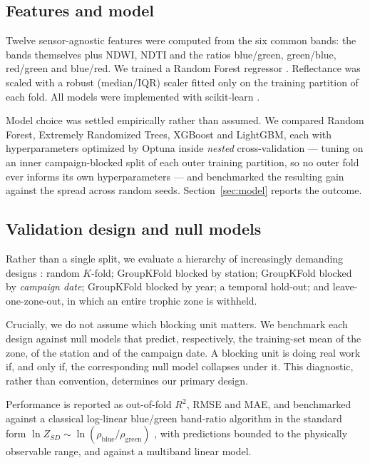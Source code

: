 \documentclass[final,5p,times,twocolumn,authoryear]{elsarticle}
\begin{document}
\subsection{Features and model}

Twelve sensor-agnostic features were computed from the six common bands: the
bands themselves plus NDWI, NDTI and the ratios blue/green, green/blue,
red/green and blue/red. We trained a Random Forest regressor
\citep{Breiman2001}. Reflectance was scaled with a robust (median/IQR) scaler
fitted only on the training partition of each fold. All models were
implemented with scikit-learn \citep{Pedregosa2011}.

Model choice was settled empirically rather than assumed. We compared Random
Forest, Extremely Randomized Trees, XGBoost \citep{Chen2016} and LightGBM,
each with hyperparameters optimized by Optuna \citep{Akiba2019} inside
\emph{nested} cross-validation --- tuning on an inner campaign-blocked split
of each outer training partition, so no outer fold ever informs its own
hyperparameters --- and benchmarked the resulting gain against the spread
across random seeds. Section~\ref{sec:model} reports the outcome.

\subsection{Validation design and null models}\label{sec:valdesign}

Rather than a single split, we evaluate a hierarchy of increasingly demanding
designs \citep{Roberts2017}: random $K$-fold; GroupKFold blocked by station;
GroupKFold blocked by \emph{campaign date}; GroupKFold blocked by year; a
temporal hold-out; and leave-one-zone-out, in which an entire trophic zone is
withheld.

Crucially, we do not assume which blocking unit matters. We benchmark each
design against null models that predict, respectively, the training-set mean
of the zone, of the station and of the campaign date. A blocking unit is
doing real work if, and only if, the corresponding null model collapses under
it. This diagnostic, rather than convention, determines our primary design.

Performance is reported as out-of-fold $R^2$, RMSE and MAE, and benchmarked
against a classical log-linear blue/green band-ratio algorithm in the
standard form $\ln Z_{SD} \sim \ln(\rho_{\mathrm{blue}}/\rho_{\mathrm{green}})$
\citep{Kloiber2002}, with predictions bounded to the physically observable
range, and against a multiband linear model.
\end{document}
